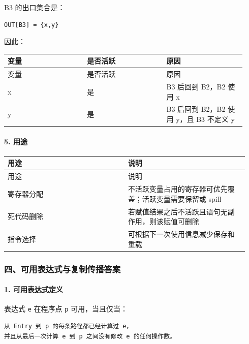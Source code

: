 \documentclass[UTF8]{ctexart}
\begin{document}
B3 的出口集合是：

\begin{Verbatim}[fontsize=\small,breaklines=true]
OUT[B3] = {x,y}
\end{Verbatim}

因此：

\begin{longtable}{|p{0.31\linewidth}|p{0.31\linewidth}|p{0.31\linewidth}|}
\hline
变量 & 是否活跃 & 原因 \\
\hline
\endfirsthead
变量 & 是否活跃 & 原因 \\
\hline
\endhead
x & 是 & B3 后回到 B2，B2 使用 x \\
\hline
y & 是 & B3 后回到 B2，B2 使用 y，且 B3 不定义 y \\
\hline
\end{longtable}

\paragraph*{5. 用途}

\begin{longtable}{|p{0.47\linewidth}|p{0.47\linewidth}|}
\hline
用途 & 说明 \\
\hline
\endfirsthead
用途 & 说明 \\
\hline
\endhead
寄存器分配 & 不活跃变量占用的寄存器可优先覆盖；活跃变量需要保留或 spill \\
\hline
死代码删除 & 若赋值结果之后不活跃且语句无副作用，则该赋值可删除 \\
\hline
指令选择 & 可根据下一次使用信息减少保存和重载 \\
\hline
\end{longtable}

\subsubsection*{四、可用表达式与复制传播答案}

\paragraph*{1. 可用表达式定义}

表达式 \texttt{e} 在程序点 \texttt{p} 可用，当且仅当：

\begin{Verbatim}[fontsize=\small,breaklines=true]
从 Entry 到 p 的每条路径都已经计算过 e，
并且从最后一次计算 e 到 p 之间没有修改 e 的任何操作数。
\end{Verbatim}
\end{document}
